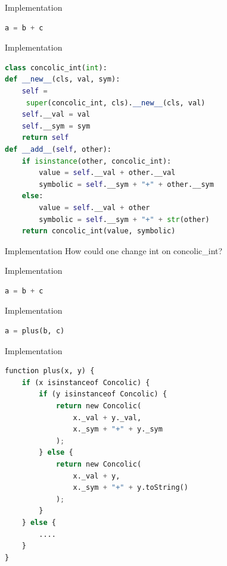 \documentclass{beamer}
\begin{document}
\begin{frame}[fragile]{Implementation}
\begin{lstlisting}[language=python,escapechar=@]
a = b + c
\end{lstlisting}
\end{frame}

\begin{frame}[fragile]{Implementation}
\begin{lstlisting}[language=python,escapechar=@]
class concolic_int(int):
def __new__(cls, val, sym):
    self =
     super(concolic_int, cls).__new__(cls, val)
    self.__val = val
    self.__sym = sym
    return self
def __add__(self, other):
    if isinstance(other, concolic_int):
        value = self.__val + other.__val
        symbolic = self.__sym + "+" + other.__sym
    else:
        value = self.__val + other
        symbolic = self.__sym + "+" + str(other)
    return concolic_int(value, symbolic)
\end{lstlisting}
\end{frame}

\begin{frame}[fragile]{Implementation}
How could one change int on concolic\_int?
\end{frame}

\begin{frame}[fragile]{Implementation}
\begin{lstlisting}[language=python,escapechar=@]
a = b + c
\end{lstlisting}
\end{frame}

\begin{frame}[fragile]{Implementation}
\begin{lstlisting}[language=python,escapechar=@]
a = plus(b, c)
\end{lstlisting}
\end{frame}

\begin{frame}[fragile]{Implementation}
\begin{lstlisting}[language=python,escapechar=@]
function plus(x, y) {
    if (x isinstanceof Concolic) {
        if (y isinstanceof Concolic) {
            return new Concolic(
                x._val + y._val,
                x._sym + "+" + y._sym
            );
        } else {
            return new Concolic(
                x._val + y,
                x._sym + "+" + y.toString()
            );
        }
    } else {
        ....
    }
}
\end{lstlisting}
\end{frame}
\end{document}
